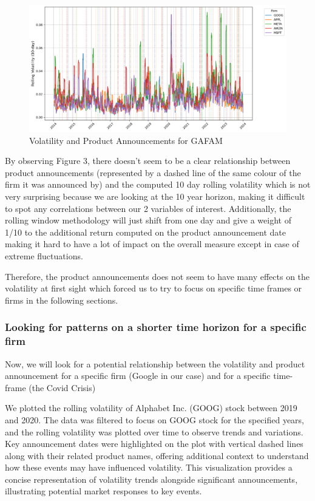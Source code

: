 \documentclass[12pt, oneside]{article}
\begin{document}
\begin{figure}[H]
    \centering
    \includegraphics[width=0.8\linewidth]{GAFAM_pattern.png}
    \caption{Volatility and Product Announcements for GAFAM}
    \label{fig:GAFAM_pattern}
\end{figure}

By observing Figure 3, there doesn't seem to be a clear relationship between product announcements (represented by a dashed line of the same colour of the firm it was announced by) and the computed 10 day rolling volatility which is not very surprising because we are looking at the 10 year horizon, making it difficult to spot any correlations between our 2 variables of interest. Additionally, the rolling window methodology will just shift from one day and give a weight of 1/10 to the additional return computed on the product announcement date making it hard to have a lot of impact on the overall measure except in case of extreme fluctuations.

Therefore, the product announcements does not seem to have many effects on the volatility at first sight which forced us to try to focus on specific time frames or firms in the following sections.

\subsubsection{Looking for patterns on a shorter time horizon for a specific firm}
Now, we will look for a potential relationship between the volatility and product announcement for a specific firm (Google in our case) and for a specific time-frame (the Covid Crisis)

We plotted the rolling volatility of Alphabet Inc. (GOOG) stock between 2019 and 2020. The data was filtered to focus on GOOG stock for the specified years, and the rolling volatility was plotted over time to observe trends and variations. Key announcement dates were highlighted on the plot with vertical dashed lines along with their related product names, offering additional context to understand how these events may have influenced volatility. This visualization provides a concise representation of volatility trends alongside significant announcements, illustrating potential market responses to key events. 
\end{document}
